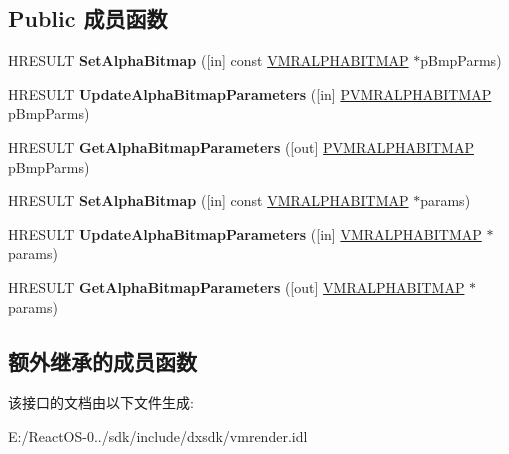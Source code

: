 \subsection*{Public 成员函数}
\begin{DoxyCompactItemize}
\item 
\mbox{\label{interface_i_v_m_r_mixer_bitmap_a13aa713418c93fc3779cd00cdba558e3}} 
H\+R\+E\+S\+U\+LT {\bfseries Set\+Alpha\+Bitmap} (\mbox{[}in\mbox{]} const \hyperlink{struct___v_m_r_a_l_p_h_a_b_i_t_m_a_p}{V\+M\+R\+A\+L\+P\+H\+A\+B\+I\+T\+M\+AP} $\ast$p\+Bmp\+Parms)
\item 
\mbox{\label{interface_i_v_m_r_mixer_bitmap_a98fb93e4d5463a6001e3ee4aaff98b1b}} 
H\+R\+E\+S\+U\+LT {\bfseries Update\+Alpha\+Bitmap\+Parameters} (\mbox{[}in\mbox{]} \hyperlink{struct___v_m_r_a_l_p_h_a_b_i_t_m_a_p}{P\+V\+M\+R\+A\+L\+P\+H\+A\+B\+I\+T\+M\+AP} p\+Bmp\+Parms)
\item 
\mbox{\label{interface_i_v_m_r_mixer_bitmap_af18ad20f2df6e1921204640eb4e91159}} 
H\+R\+E\+S\+U\+LT {\bfseries Get\+Alpha\+Bitmap\+Parameters} (\mbox{[}out\mbox{]} \hyperlink{struct___v_m_r_a_l_p_h_a_b_i_t_m_a_p}{P\+V\+M\+R\+A\+L\+P\+H\+A\+B\+I\+T\+M\+AP} p\+Bmp\+Parms)
\item 
\mbox{\label{interface_i_v_m_r_mixer_bitmap_a15e42665942ff745064bab7af13d4dbf}} 
H\+R\+E\+S\+U\+LT {\bfseries Set\+Alpha\+Bitmap} (\mbox{[}in\mbox{]} const \hyperlink{struct___v_m_r_a_l_p_h_a_b_i_t_m_a_p}{V\+M\+R\+A\+L\+P\+H\+A\+B\+I\+T\+M\+AP} $\ast$params)
\item 
\mbox{\label{interface_i_v_m_r_mixer_bitmap_a6c3217a13741aa34197e5ded10355d8f}} 
H\+R\+E\+S\+U\+LT {\bfseries Update\+Alpha\+Bitmap\+Parameters} (\mbox{[}in\mbox{]} \hyperlink{struct___v_m_r_a_l_p_h_a_b_i_t_m_a_p}{V\+M\+R\+A\+L\+P\+H\+A\+B\+I\+T\+M\+AP} $\ast$params)
\item 
\mbox{\label{interface_i_v_m_r_mixer_bitmap_aa3f12e4dce7e3e6347f69e2a82bc3ad5}} 
H\+R\+E\+S\+U\+LT {\bfseries Get\+Alpha\+Bitmap\+Parameters} (\mbox{[}out\mbox{]} \hyperlink{struct___v_m_r_a_l_p_h_a_b_i_t_m_a_p}{V\+M\+R\+A\+L\+P\+H\+A\+B\+I\+T\+M\+AP} $\ast$params)
\end{DoxyCompactItemize}
\subsection*{额外继承的成员函数}


该接口的文档由以下文件生成\+:\begin{DoxyCompactItemize}
\item 
E\+:/\+React\+O\+S-\/0../sdk/include/dxsdk/vmrender.\+idl\end{DoxyCompactItemize}
